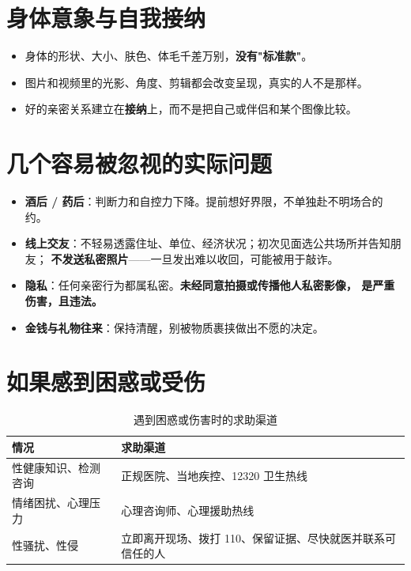 \documentclass[12pt,UTF8,openany]{ctexbook}
\begin{document}
\section{身体意象与自我接纳}

\begin{itemize}[leftmargin=2em]
  \item 身体的形状、大小、肤色、体毛千差万别，\textbf{没有"标准款"}。
  \item 图片和视频里的光影、角度、剪辑都会改变呈现，真实的人不是那样。
  \item 好的亲密关系建立在\textbf{接纳}上，而不是把自己或伴侣和某个图像比较。
\end{itemize}

\section{几个容易被忽视的实际问题}

\begin{itemize}[leftmargin=2em]
  \item \textbf{酒后 / 药后}：判断力和自控力下降。提前想好界限，不单独赴不明场合的约。
  \item \textbf{线上交友}：不轻易透露住址、单位、经济状况；初次见面选公共场所并告知朋友；
        \textbf{不发送私密照片}——一旦发出难以收回，可能被用于敲诈。
  \item \textbf{隐私}：任何亲密行为都属私密。\textbf{未经同意拍摄或传播他人私密影像，
        是严重伤害，且违法。}
  \item \textbf{金钱与礼物往来}：保持清醒，别被物质裹挟做出不愿的决定。
\end{itemize}

\section{如果感到困惑或受伤}

\begin{table}[htbp]
  \centering
  \caption{遇到困惑或伤害时的求助渠道}
  \begin{tabularx}{\textwidth}{@{}l X@{}}
    \toprule
    \textbf{情况} & \textbf{求助渠道} \\
    \midrule
    性健康知识、检测咨询 & 正规医院、当地疾控、12320 卫生热线 \\
    情绪困扰、心理压力 & 心理咨询师、心理援助热线 \\
    性骚扰、性侵 & 立即离开现场、拨打 110、保留证据、尽快就医并联系可信任的人 \\
    \bottomrule
  \end{tabularx}
\end{table}
\end{document}
